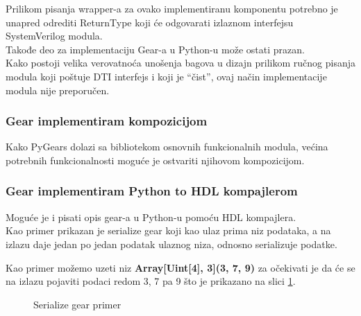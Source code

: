 Prilikom pisanja wrapper-a za ovako implementiranu komponentu potrebno je
unapred odrediti ReturnType koji će odgovarati izlaznom interfejsu SystemVerilog modula. \\
Takođe deo za implementaciju Gear-a u Python-u može ostati prazan. \\

Kako postoji velika verovatnoća unošenja bagova u dizajn prilikom ručnog pisanja
modula koji poštuje DTI interfejs i koji je ``čist'', ovaj način implementacije
modula nije preporučen.

\subsubsection{Gear implementiram kompozicijom}

Kako PyGears dolazi sa bibliotekom osnovnih funkcionalnih modula, većina
potrebnih funkcionalnosti moguće je ostvariti njihovom kompozicijom. \\

\newpage

\subsubsection{Gear implementiram Python to HDL kompajlerom}

Moguće je i pisati opis gear-a u Python-u pomoću HDL kompajlera. \\

Kao primer prikazan je serialize gear koji kao ulaz prima niz podataka, a na
izlazu daje jedan po jedan podatak ulaznog niza, odnosno serializuje podatke.



Kao primer možemo uzeti niz \textbf{Array[Uint[4], 3](3, 7, 9)} za očekivati je da će se
na izlazu pojaviti podaci redom 3, 7 pa 9 što je prikazano na slici \ref{serialize_example2}.
\begin{figure}[H]
\centering{
  \resizebox{.55\textwidth}{!}{%
    
  }}
\caption{Serialize gear primer}
\label{serialize_example2}
\end{figure}
